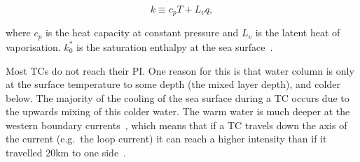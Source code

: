 \begin{equation}
k \equiv c_{p} T +L_{v} q,
\label{eq:enthalpy_per_unit_mass}
\end{equation}



where $c_p$ is the heat capacity at constant pressure and $L_{v}$ is the latent heat
of vaporisation. $k_{0}^{*}$ is the saturation enthalpy at the sea
surface~\cite{emanuel2018progress}.%






Most TCs do not reach their PI.
One reason for this is that
water column is only at the surface temperature
to some depth (the mixed layer depth), and colder below.
The majority of the cooling of
the sea surface during a TC occurs due to the
upwards mixing of this colder water.
The warm water
is much deeper at the western boundary currents~\cite{hogg1995western},
which means that if a TC
travels down the axis of the current (e.g.~the loop current)
it can reach a higher intensity than
if it travelled 20km to one side~\cite{emanuel2005divine}.
